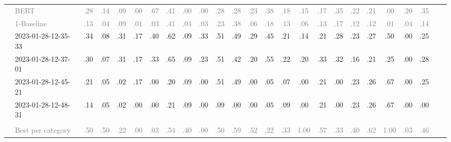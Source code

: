 \begin{table*}
\begin{tabular}{@{}ll@{\hspace{10pt}}c@{\hspace{5pt}}cccccccccccccccccccccc@{}}
& \textcolor{gray}{BERT} & \textcolor{gray}{.28} & \textcolor{gray}{.14} & \textcolor{gray}{.09} & \textcolor{gray}{.00} & \textcolor{gray}{.67} & \textcolor{gray}{.41} & \textcolor{gray}{.00} & \textcolor{gray}{.00} & \textcolor{gray}{.28} & \textcolor{gray}{.28} & \textcolor{gray}{.23} & \textcolor{gray}{.38} & \textcolor{gray}{.18} & \textcolor{gray}{.15} & \textcolor{gray}{.17} & \textcolor{gray}{.35} & \textcolor{gray}{.22} & \textcolor{gray}{.21} & \textcolor{gray}{.00} & \textcolor{gray}{.20} & \textcolor{gray}{.35} \\
& \textcolor{gray}{1-Baseline} & \textcolor{gray}{.13} & \textcolor{gray}{.04} & \textcolor{gray}{.09} & \textcolor{gray}{.01} & \textcolor{gray}{.03} & \textcolor{gray}{.41} & \textcolor{gray}{.04} & \textcolor{gray}{.03} & \textcolor{gray}{.23} & \textcolor{gray}{.38} & \textcolor{gray}{.06} & \textcolor{gray}{.18} & \textcolor{gray}{.13} & \textcolor{gray}{.06} & \textcolor{gray}{.13} & \textcolor{gray}{.17} & \textcolor{gray}{.12} & \textcolor{gray}{.12} & \textcolor{gray}{.01} & \textcolor{gray}{.04} & \textcolor{gray}{.14} \\
& 2023-01-28-12-35-33 & .34 & .08 & .31 & .17 & .40 & .62 & .09 & .33 & .51 & .49 & .29 & .45 & .21 & .14 & .21 & .28 & .23 & .27 & .50 & .00 & .25 \\
& 2023-01-28-12-37-01 & .30 & .07 & .31 & .17 & .33 & .65 & .09 & .23 & .51 & .42 & .20 & .55 & .22 & .20 & .33 & .32 & .16 & .21 & .25 & .00 & .28 \\
& 2023-01-28-12-45-21 & .21 & .05 & .02 & .17 & .00 & .20 & .09 & .00 & .51 & .49 & .00 & .05 & .07 & .00 & .21 & .00 & .23 & .26 & .67 & .00 & .25 \\
& 2023-01-28-12-48-31 & .14 & .05 & .02 & .00 & .00 & .21 & .09 & .00 & .09 & .00 & .00 & .05 & .09 & .00 & .21 & .00 & .23 & .26 & .67 & .00 & .00 \\
\addlinespace
\multicolumn{2}{@{}l}{\emph{New York Times}} \\
& \textcolor{gray}{Best per category} & \textcolor{gray}{.50} & \textcolor{gray}{.50} & \textcolor{gray}{.22} & \textcolor{gray}{.00} & \textcolor{gray}{.03} & \textcolor{gray}{.54} & \textcolor{gray}{.40} & \textcolor{gray}{.00} & \textcolor{gray}{.50} & \textcolor{gray}{.59} & \textcolor{gray}{.52} & \textcolor{gray}{.22} & \textcolor{gray}{.33} & \textcolor{gray}{1.00} & \textcolor{gray}{.57} & \textcolor{gray}{.33} & \textcolor{gray}{.40} & \textcolor{gray}{.62} & \textcolor{gray}{1.00} & \textcolor{gray}{.03} & \textcolor{gray}{.46} \\

\end{tabular}
\end{table*}
